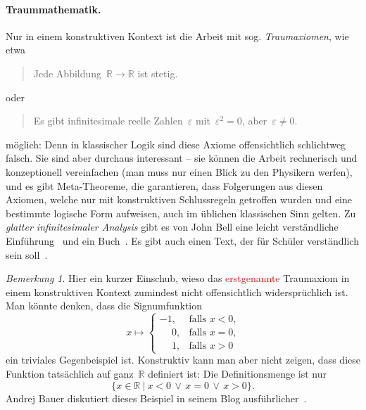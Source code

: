 \documentclass[a4paper,ngerman,12pt]{scrartcl}
\theoremstyle{definition}
\theoremstyle{plain}
\theoremstyle{remark}
\newtheorem{bem}[defn]{Bemerkung}
\newcommand{\RR}{\mathbb{R}}
\renewcommand{\_}{\mathpunct{.}\,}
\newcommand{\?}{\,{:}\,}
\newcommand{\XXX}[1]{\textcolor{red}{#1}}
\begin{document}
\paragraph{Traummathematik.} Nur in einem konstruktiven Kontext ist die Arbeit
mit sog. \emph{Traum\-axio\-men}, wie etwa
\begin{quote}Jede Abbildung~$\RR \to \RR$ ist stetig.\end{quote}
oder
\begin{quote}Es gibt infinitesimale reelle Zahlen~$\varepsilon$
mit~$\varepsilon^2 = 0$, aber~$\varepsilon \neq 0$.\end{quote}
möglich: Denn in klassischer Logik sind diese Axiome offensichtlich schlichtweg
falsch. Sie sind aber durchaus interessant -- sie können die Arbeit
rechnerisch und konzeptionell vereinfachen (man muss nur einen Blick zu den
Physikern werfen), und es gibt Meta-Theoreme, die garantieren, dass Folgerungen
aus diesen Axiomen, welche nur mit konstruktiven Schlussregeln getroffen wurden
und eine bestimmte logische Form aufweisen, auch im üblichen klassischen Sinn
gelten. Zu \emph{glatter infinitesimaler Analysis} gibt es von John Bell eine
leicht verständliche Einführung~\cite{bell:invitation} und ein
Buch~\cite{bell:primer}. Es gibt auch einen Text, der für Schüler verständlich
sein soll~\cite{mathezirkel:sdg}.

\begin{bem}Hier ein kurzer Einschub, wieso das \XXX{erstgenannte} Traumaxiom
in einem konstruktiven Kontext zumindest nicht offensichtlich widersprüchlich
ist. Man könnte denken, dass die Signumfunktion
\[ x \longmapsto \begin{cases}
  -1, & \text{falls $x < 0$,} \\
  \phantom{+}0, & \text{falls $x = 0$,} \\
  \phantom{+}1, & \text{falls $x > 0$}
\end{cases} \]
ein triviales Gegenbeispiel ist. Konstruktiv kann man aber nicht zeigen, dass
diese Funktion tatsächlich auf ganz~$\RR$ definiert ist: Die Definitionsmenge
ist nur
\[ \{ x \in \RR \ |\  x < 0 \,\vee\, x = 0 \,\vee\, x > 0 \}. \]
Andrej Bauer diskutiert dieses Beispiel in seinem Blog
ausführlicher~\cite{bauer:blog:stetigkeit}.
\end{bem}
\end{document}
